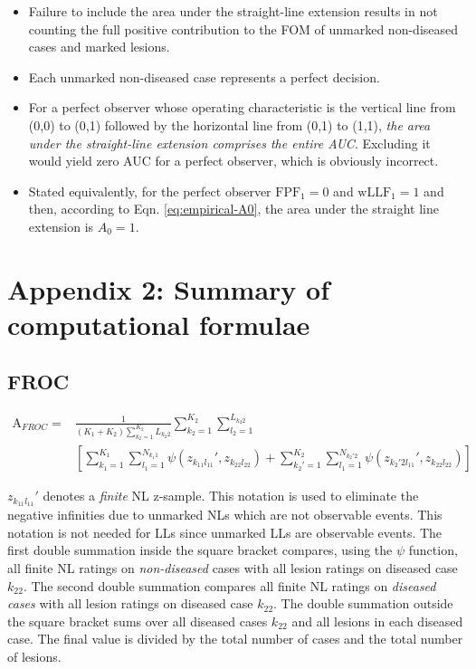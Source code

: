 \documentclass[
]{book}
\providecommand{\tightlist}{%
  \setlength{\itemsep}{0pt}\setlength{\parskip}{0pt}}
\begin{document}
\begin{itemize}
\tightlist
\item
  Failure to include the area under the straight-line extension results in not counting the full positive contribution to the FOM of unmarked non-diseased cases and marked lesions.
\item
  Each unmarked non-diseased case represents a perfect decision.
\item
  For a perfect observer whose operating characteristic is the vertical line from (0,0) to (0,1) followed by the horizontal line from (0,1) to (1,1), \emph{the area under the straight-line extension comprises the entire AUC}. Excluding it would yield zero AUC for a perfect observer, which is obviously incorrect.
\item
  Stated equivalently, for the perfect observer \(\text{FPF}_1 = 0\) and \(\text{wLLF}_1 = 1\) and then, according to Eqn. \eqref{eq:empirical-A0}, the area under the straight line extension is \(A_0 = 1\).
\end{itemize}

\hypertarget{empirical-summary-computational}{%
\section{Appendix 2: Summary of computational formulae}\label{empirical-summary-computational}}

\hypertarget{froc}{%
\subsection{FROC}\label{froc}}

\begin{equation}
\begin{aligned}
\text{A}_{FROC} =& \frac{1}{\left ( K_1+K_2 \right )\sum_{k_2=1}^{K_2}L_{k_2 2}}\sum_{k_2=1}^{K_2}\sum_{l_2=1}^{L_{k_2 2}} \\
&\left[ \sum_{k_1=1}^{K_1}\sum_{l_1=1}^{N_{k_1 1}} \psi\left ( z_{k_11l_11}',z_{k_22l_22} \right )+\sum_{k_2'=1}^{K_2}\sum_{l_1=1}^{N_{k_2' 2}} \psi\left ( z_{k_2'2l_11}',z_{k_22l_22} \right )
\right]
\end{aligned}
\label{eq:empirical-computational-froc}
\end{equation}

\(z_{k_11l_11}'\) denotes a \emph{finite} NL z-sample. This notation is used to eliminate the negative infinities due to unmarked NLs which are not observable events. This notation is not needed for LLs since unmarked LLs are observable events. The first double summation inside the square bracket compares, using the \(\psi\) function, all finite NL ratings on \emph{non-diseased} cases with all lesion ratings on diseased case \(k_22\). The second double summation compares all finite NL ratings on \emph{diseased cases} with all lesion ratings on diseased case \(k_22\). The double summation outside the square bracket sums over all diseased cases \(k_22\) and all lesions in each diseased case. The final value is divided by the total number of cases and the total number of lesions.
\end{document}
